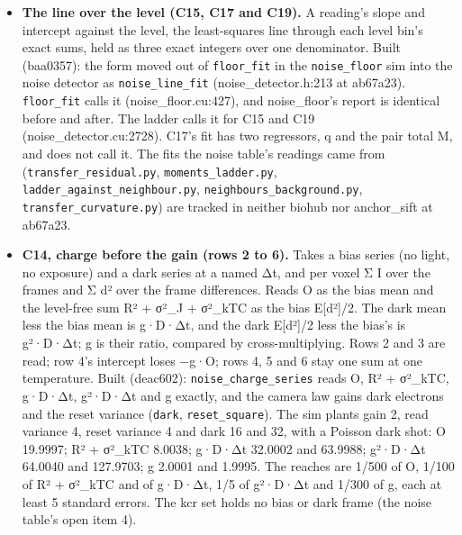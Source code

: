 \begin{enumerate}
\begin{itemize}
\item \textbf{The line over the level (C15, C17 and C19).} A reading's slope and intercept against the level, the least-squares line through each level bin's exact sums, held as three exact integers over one denominator. Built (baa0357): the form moved out of \texttt{floor\_\allowbreak{}fit} in the \texttt{noise\_\allowbreak{}floor} sim into the noise detector as \texttt{noise\_\allowbreak{}line\_\allowbreak{}fit} (noise\_\allowbreak{}detector.h:213 at ab67a23). \texttt{floor\_\allowbreak{}fit} calls it (noise\_\allowbreak{}floor.cu:427), and noise\_\allowbreak{}floor's report is identical before and after. The ladder calls it for C15 and C19 (noise\_\allowbreak{}detector.cu:2728). C17's fit has two regressors, q and the pair total M, and does not call it. The fits the noise table's readings came from (\texttt{transfer\_\allowbreak{}residual.\allowbreak{}py}, \texttt{moments\_\allowbreak{}ladder.\allowbreak{}py}, \texttt{ladder\_\allowbreak{}against\_\allowbreak{}neighbour.\allowbreak{}py}, \texttt{neighbours\_\allowbreak{}background.\allowbreak{}py}, \texttt{transfer\_\allowbreak{}curvature.\allowbreak{}py}) are tracked in neither biohub nor anchor\_\allowbreak{}sift at ab67a23.
\item \textbf{C14, charge before the gain (rows 2 to 6).} Takes a bias series (no light, no exposure) and a dark series at a named Δt, and per voxel Σ I over the frames and Σ d² over the frame differences. Reads O as the bias mean and the level-free sum R² + σ²\_\allowbreak{}J + σ²\_\allowbreak{}kTC as the bias E[d²]/2. The dark mean less the bias mean is g·D·Δt, and the dark E[d²]/2 less the bias's is g²·D·Δt; g is their ratio, compared by cross-multiplying. Rows 2 and 3 are read; row 4's intercept loses −g·O; rows 4, 5 and 6 stay one sum at one temperature. Built (deac602): \texttt{noise\_\allowbreak{}charge\_\allowbreak{}series} reads O, R² + σ²\_\allowbreak{}kTC, g·D·Δt, g²·D·Δt and g exactly, and the camera law gains dark electrons and the reset variance (\texttt{dark}, \texttt{reset\_\allowbreak{}square}). The sim plants gain 2, read variance 4, reset variance 4 and dark 16 and 32, with a Poisson dark shot: O 19.9997; R² + σ²\_\allowbreak{}kTC 8.0038; g·D·Δt 32.0002 and 63.9988; g²·D·Δt 64.0040 and 127.9703; g 2.0001 and 1.9995. The reaches are 1/500 of O, 1/100 of R² + σ²\_\allowbreak{}kTC and of g·D·Δt, 1/5 of g²·D·Δt and 1/300 of g, each at least 5 standard errors. The kcr set holds no bias or dark frame (the noise table's open item 4).

\end{itemize}
\end{enumerate}
